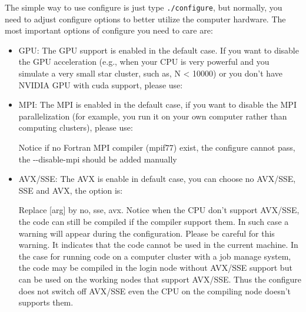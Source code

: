 The simple way to use configure is just type {\tt ./configure}, but normally, you need to adjust configure options to better utilize the computer hardware. The most important options of configure you need to care are:
\begin{itemize}

    \item GPU: The GPU support is enabled in the default case. If you want to disable the GPU acceleration (e.g., when your CPU is very powerful and you simulate a very small star cluster, such as, N < 10000) or you don't have NVIDIA GPU with cuda support, please use:
    

    \item MPI: The MPI is enabled in the default case, if you want to disable the MPI parallelization (for example, you run it on your own computer rather than computing clusters), please use:
    

    Notice if no Fortran MPI compiler (mpif77) exist, the configure cannot pass, the -{}-disable-mpi should be added manually
    
    \item AVX/SSE: The AVX is enable in default case, you can choose no AVX/SSE, SSE and AVX, the option is:
    

    Replace [arg] by no, sse, avx. Notice when the CPU don't support AVX/SSE, the code can still be compiled if the compiler support them. In such case a warning will appear during the configuration. Please be careful for this warning. It indicates that the code cannot be used in the current machine. In the case for running code on a computer cluster with a job manage system, the code may be compiled in the login node without AVX/SSE support but can be used on the working nodes that support AVX/SSE. Thus the configure does not switch off AVX/SSE even the CPU on the compiling node doesn't supports them.


\end{itemize}
